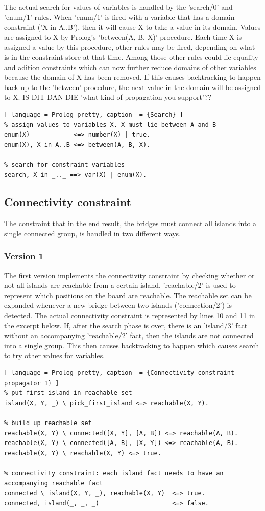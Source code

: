 \documentclass{report}
\begin{document}
The actual search for values of variables is handled by the 'search/0' and 'enum/1' rules. When 'enum/1' is fired with a variable that has a domain constraint ('X in A..B'), then it will cause X to take a value in its domain. Values are assigned to X by Prolog's 'between(A, B, X)' procedure. Each time X is assigned a value by this procedure, other rules may be fired, depending on what is in the constraint store at that time. Among those other rules could lie equality and adition constraints which can now further reduce domains of other variables because the domain of X has been removed. If this causes backtracking to happen back up to the 'between' procedure, the next value in the domain will be assigned to X. IS DIT DAN DIE 'what kind of propagation you support'??
\begin{lstlisting}[ language = Prolog-pretty, caption  = {Search} ]
% assign values to variables X. X must lie between A and B
enum(X)            <=> number(X) | true.
enum(X), X in A..B <=> between(A, B, X).

% search for constraint variables
search, X in _.._ ==> var(X) | enum(X).
\end{lstlisting}

\subsection{Connectivity constraint}
The constraint that in the end result, the bridges must connect all islands into a single connected group, is handled in two different ways.

\subsubsection{Version 1}
The first version implements the connectivity constraint by checking whether or not all islands are reachable from a certain island. 'reachable/2' is used to represent which positions on the board are reachable. The reachable set can be expanded whenever a new bridge between two islands ('connection/2') is detected. The actual connectivity constraint is represented by lines 10 and 11 in the excerpt below. If, after the search phase is over, there is an 'island/3' fact without an accompanying 'reachable/2' fact, then the islands are not connected into a single group. This then causes backtracking to happen which causes search to try other values for variables.

\begin{lstlisting}[ language = Prolog-pretty, caption  = {Connectivity constraint propagator 1} ]
% put first island in reachable set
island(X, Y, _) \ pick_first_island <=> reachable(X, Y).

% build up reachable set
reachable(X, Y) \ connected([X, Y], [A, B]) <=> reachable(A, B).
reachable(X, Y) \ connected([A, B], [X, Y]) <=> reachable(A, B).
reachable(X, Y) \ reachable(X, Y) <=> true.

% connectivity constraint: each island fact needs to have an accompanying reachable fact
connected \ island(X, Y, _), reachable(X, Y)  <=> true.
connected, island(_, _, _)                    <=> false.
\end{lstlisting}
\end{document}
